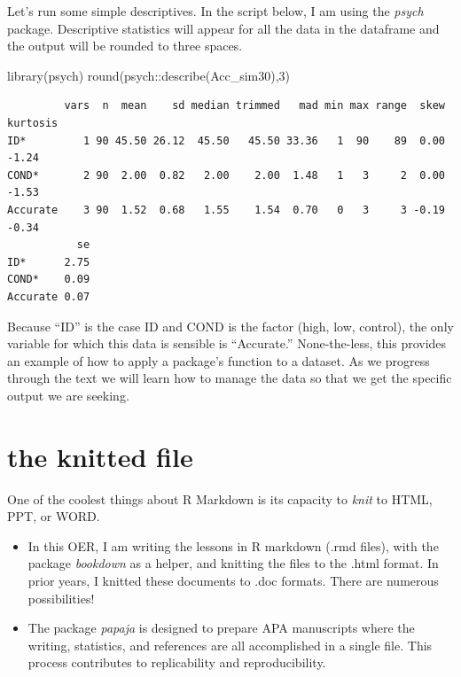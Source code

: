 \documentclass[
  english,
]{book}
\newenvironment{Shaded}{\begin{snugshade}}{\end{snugshade}}
\newcommand{\DecValTok}[1]{\textcolor[rgb]{0.00,0.00,0.81}{#1}}
\newcommand{\FunctionTok}[1]{\textcolor[rgb]{0.00,0.00,0.00}{#1}}
\newcommand{\NormalTok}[1]{#1}
\newcommand{\SpecialCharTok}[1]{\textcolor[rgb]{0.00,0.00,0.00}{#1}}
\providecommand{\tightlist}{%
  \setlength{\itemsep}{0pt}\setlength{\parskip}{0pt}}
\begin{document}
Let's run some simple descriptives. In the script below, I am using the \emph{psych} package. Descriptive statistics will appear for all the data in the dataframe and the output will be rounded to three spaces.

\begin{Shaded}
\begin{Highlighting}[]
\FunctionTok{library}\NormalTok{(psych)}
\FunctionTok{round}\NormalTok{(psych}\SpecialCharTok{::}\FunctionTok{describe}\NormalTok{(Acc\_sim30),}\DecValTok{3}\NormalTok{)}
\end{Highlighting}
\end{Shaded}

\begin{verbatim}
         vars  n  mean    sd median trimmed   mad min max range  skew kurtosis
ID*         1 90 45.50 26.12  45.50   45.50 33.36   1  90    89  0.00    -1.24
COND*       2 90  2.00  0.82   2.00    2.00  1.48   1   3     2  0.00    -1.53
Accurate    3 90  1.52  0.68   1.55    1.54  0.70   0   3     3 -0.19    -0.34
           se
ID*      2.75
COND*    0.09
Accurate 0.07
\end{verbatim}

Because ``ID'' is the case ID and COND is the factor (high, low, control), the only variable for which this data is sensible is ``Accurate.'' None-the-less, this provides an example of how to apply a package's function to a dataset. As we progress through the text we will learn how to manage the data so that we get the specific output we are seeking.

\hypertarget{the-knitted-file}{%
\section{the knitted file}\label{the-knitted-file}}

One of the coolest things about R Markdown is its capacity to \emph{knit} to HTML, PPT, or WORD.

\begin{itemize}
\tightlist
\item
  In this OER, I am writing the lessons in R markdown (.rmd files), with the package \emph{bookdown} as a helper, and knitting the files to the .html format. In prior years, I knitted these documents to .doc formats. There are numerous possibilities!
\item
  The package \emph{papaja} is designed to prepare APA manuscripts where the writing, statistics, and references are all accomplished in a single file. This process contributes to replicability and reproducibility.
\end{itemize}
\end{document}
